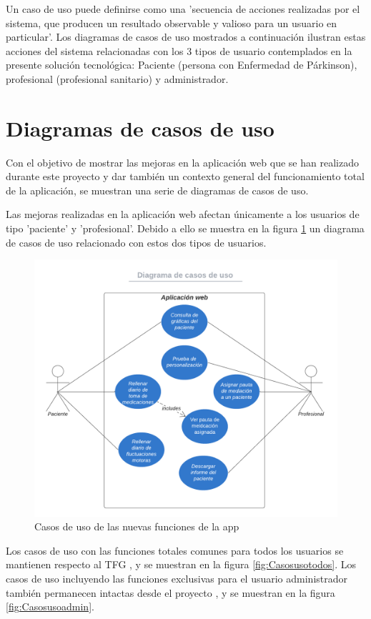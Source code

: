 Un caso de uso puede definirse como una 'secuencia de acciones realizadas por el sistema, que producen un resultado observable y valioso para un usuario en particular'\cite{Cillero2024}. Los diagramas de casos de uso mostrados a continuación ilustran estas acciones del sistema relacionadas con los 3 tipos de usuario contemplados en la presente solución tecnológica: Paciente (persona con Enfermedad de Párkinson), profesional (profesional sanitario) y administrador.
\section{Diagramas de casos de uso}
Con el objetivo de mostrar las mejoras en la aplicación web que se han realizado durante este proyecto y dar también un contexto general del funcionamiento total de la aplicación, se muestran una serie de diagramas de casos de uso.

Las mejoras realizadas en la aplicación web afectan únicamente a los usuarios de tipo 'paciente' y 'profesional'. Debido a ello se muestra en la figura \ref{fig:Casosdeuso} un diagrama de casos de uso relacionado con estos dos tipos de usuarios.
\begin{figure}[h]
    \centering
    \includegraphics[width=1\textwidth]{img/Casosdeuso.png}
    \caption{Casos de uso de las nuevas funciones de la app}
    \label{fig:Casosdeuso}
\end{figure}

Los casos de uso con las funciones totales comunes para todos los usuarios se  mantienen respecto al TFG \cite{Martos2024}, y se muestran en la figura \ref{fig:Casosusotodos}. Los casos de uso incluyendo las funciones exclusivas para el usuario administrador también permanecen intactas desde el proyecto \cite{Martos2024}, y se muestran en la figura \ref{fig:Casosusoadmin}.

